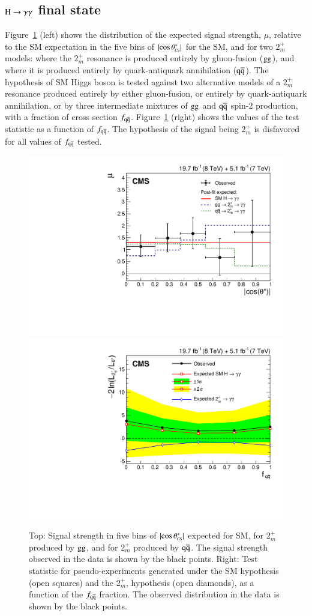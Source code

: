 \subsection{$\mathrm{H}\to\gamma\gamma$ final state}
\label{sec:exotic_hgg}

Figure~\ref{fig:hgg_spin2} (left) shows the distribution of the
expected signal strength, $\mu$, relative to the SM expectation in the
five bins of $|{\cos\theta^{\ast}_{\mbox{\tiny{CS}}}}|$ for the SM, and for two $2_m^+$ models:
where the $2_m^+$ resonance is produced entirely by gluon-fusion
($\mathrm{g}\mathrm{g}$), and where it is produced entirely by quark-antiquark
annihilation ($\mathrm{q}\mathrm{\overline{q}}$).  The hypothesis of SM Higgs boson is
tested against two alternative models of a $2_m^+$ resonance produced
entirely by either gluon-fusion, or entirely by quark-antiquark
annihilation, or by three intermediate mixtures of $\mathrm{g}\mathrm{g}$ and
$\mathrm{q}\mathrm{\overline{q}}$ spin-2 production, with a fraction of cross section
$f_{\mathrm{\mathrm{q}\mathrm{\overline{q}}}}$. Figure~\ref{fig:hgg_spin2} (right) shows the values of
the test statistic as a function of $f_{\mathrm{\mathrm{q}\mathrm{\overline{q}}}}$.  The hypothesis of the
signal being $2_m^+$ is disfavored for all values of $f_{\mathrm{\mathrm{q}\mathrm{\overline{q}}}}$
tested.


\begin{figure}[!hbtp]
  \begin{center}
    \includegraphics[width=0.49\linewidth]{figures/hgg_mucosth.pdf}
    \includegraphics[width=0.49\linewidth]{figures/hgg_spin2_excl.pdf}
    \caption{Top: Signal strength in five bins of $|{\cos\theta^{\ast}_{\mbox{\tiny{CS}}}}|$ expected for SM, for $2^+_m$ produced
      by $\mathrm{g}\mathrm{g}$, and for $2^+_m$ produced by $\mathrm{\mathrm{q}\mathrm{\overline{q}}}$.
      The signal strength observed in the data is shown by the black points.
      Right: Test statistic for pseudo-experiments generated under the SM hypothesis (open squares) and the
$2^+_m$, hypothesis (open diamonds), as a function of the $f_{\mathrm{\mathrm{q}\mathrm{\overline{q}}}}$ fraction.
      The observed distribution in the data is shown by the black points.
      \label{fig:hgg_spin2}
    }
  \end{center}
\end{figure}




